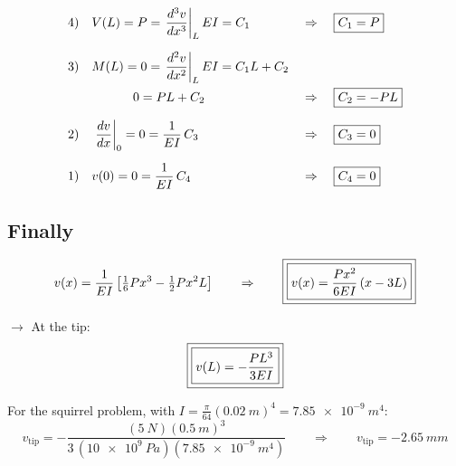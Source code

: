 \documentclass[11pt]{article}
\begin{document}
\begin{align*}
  \text{4)} \quad & V(L) = P = \left.\frac{d^3 v}{dx^3}\right|_L EI = C_1
     && \Rightarrow \quad \boxed{C_1 = P} \\[6pt]
  \text{3)} \quad & M(L) = 0 = \left.\frac{d^2 v}{dx^2}\right|_L EI = C_1 L + C_2 \\
  & \hphantom{M(L)}\;\;\, 0 = PL + C_2
     && \Rightarrow \quad \boxed{C_2 = -PL} \\[6pt]
  \text{2)} \quad & \left.\frac{dv}{dx}\right|_0 = 0 = \frac{1}{EI}\,C_3
     && \Rightarrow \quad \boxed{C_3 = 0} \\[6pt]
  \text{1)} \quad & v(0) = 0 = \frac{1}{EI}\,C_4
     && \Rightarrow \quad \boxed{C_4 = 0}
\end{align*}

\subsection*{Finally}

\[
  v(x) = \frac{1}{EI}\left[\tfrac16 P x^3 - \tfrac12 P x^2 L\right]
  \qquad\Rightarrow\qquad
  \fbox{\fbox{$\displaystyle v(x) = \frac{P x^2}{6EI}\,(x - 3L)$}}
\]

\noindent
$\rightarrow$ At the tip:
\[
  \fbox{\fbox{$\displaystyle v(L) = -\frac{PL^3}{3EI}$}}
\]

\noindent
For the squirrel problem, with $I = \frac{\pi}{64}(\SI{0.02}{m})^4 = \SI{7.85e-9}{m^4}$:
\[
  v_{\text{tip}} = -\frac{(\SI{5}{N})(\SI{0.5}{m})^3}{3\,(\SI{10e9}{Pa})(\SI{7.85e-9}{m^4})}
  \qquad\Rightarrow\qquad
  \boxed{v_{\text{tip}} = -\SI{2.65}{mm}}
\]
\end{document}
